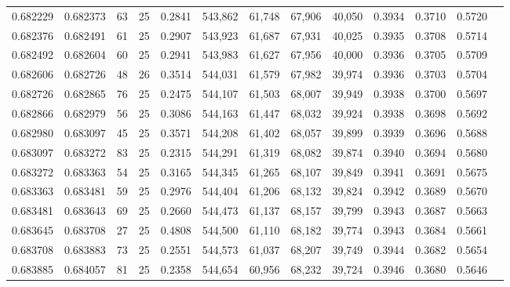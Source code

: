 \begin{tabular}{rrrrrrrrrrrrr}
0.682229 & 0.682373 &    63 &  25 &                                     0.2841 & 543,862 &  61,748 &  67,906 &  40,050 & 0.3934 & 0.3710 & 0.5720 \\
0.682376 & 0.682491 &    61 &  25 &                                     0.2907 & 543,923 &  61,687 &  67,931 &  40,025 & 0.3935 & 0.3708 & 0.5714 \\
0.682492 & 0.682604 &    60 &  25 &                                     0.2941 & 543,983 &  61,627 &  67,956 &  40,000 & 0.3936 & 0.3705 & 0.5709 \\
0.682606 & 0.682726 &    48 &  26 &                                     0.3514 & 544,031 &  61,579 &  67,982 &  39,974 & 0.3936 & 0.3703 & 0.5704 \\
0.682726 & 0.682865 &    76 &  25 &                                     0.2475 & 544,107 &  61,503 &  68,007 &  39,949 & 0.3938 & 0.3700 & 0.5697 \\
0.682866 & 0.682979 &    56 &  25 &                                     0.3086 & 544,163 &  61,447 &  68,032 &  39,924 & 0.3938 & 0.3698 & 0.5692 \\
0.682980 & 0.683097 &    45 &  25 &                                     0.3571 & 544,208 &  61,402 &  68,057 &  39,899 & 0.3939 & 0.3696 & 0.5688 \\
0.683097 & 0.683272 &    83 &  25 &                                     0.2315 & 544,291 &  61,319 &  68,082 &  39,874 & 0.3940 & 0.3694 & 0.5680 \\
0.683272 & 0.683363 &    54 &  25 &                                     0.3165 & 544,345 &  61,265 &  68,107 &  39,849 & 0.3941 & 0.3691 & 0.5675 \\
0.683363 & 0.683481 &    59 &  25 &                                     0.2976 & 544,404 &  61,206 &  68,132 &  39,824 & 0.3942 & 0.3689 & 0.5670 \\
0.683481 & 0.683643 &    69 &  25 &                                     0.2660 & 544,473 &  61,137 &  68,157 &  39,799 & 0.3943 & 0.3687 & 0.5663 \\
0.683645 & 0.683708 &    27 &  25 &                                     0.4808 & 544,500 &  61,110 &  68,182 &  39,774 & 0.3943 & 0.3684 & 0.5661 \\
0.683708 & 0.683883 &    73 &  25 &                                     0.2551 & 544,573 &  61,037 &  68,207 &  39,749 & 0.3944 & 0.3682 & 0.5654 \\
0.683885 & 0.684057 &    81 &  25 &                                     0.2358 & 544,654 &  60,956 &  68,232 &  39,724 & 0.3946 & 0.3680 & 0.5646 \\

\end{tabular}

